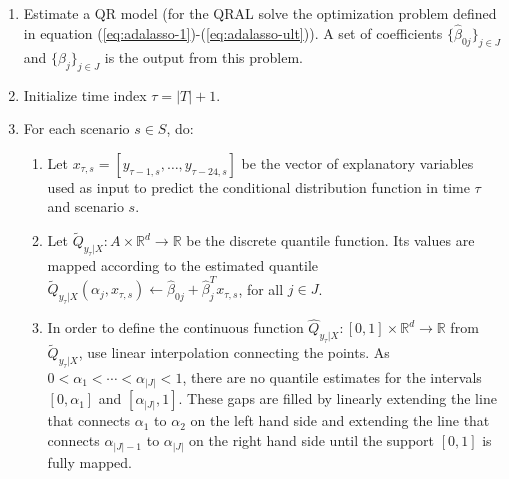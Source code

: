 \begin{enumerate}
	
	\item Estimate a QR model (for the QRAL solve the optimization problem defined in equation (\ref{eq:adalasso-1})-(\ref{eq:adalasso-ult})). 
	A set of coefficients $\{ \hat\beta_{0j} \}_{j \in J}$ and $\{ \hat\beta_{j} \}_{j \in J}$ is the output from this problem. 

	\item Initialize time index $\tau = |T| + 1$.
	
	\item For each scenario $s \in S$, do:
		\begin{enumerate}

		\item Let $x_{\tau,s} = [y_{\tau-1,s}, \dots, y_{\tau-24,s}]$ be the vector of explanatory variables used as input to predict the conditional distribution function in time $\tau$ and scenario $s$.

		\item Let $\tilde{Q}_{y_{\tau}|X}:A \times \mathbb{R}^d \rightarrow \mathbb{R}$ be the discrete quantile function. Its values are mapped according to the estimated quantile $\tilde Q_{y_{\tau}|X}(\alpha_j, x_{\tau,s}) \leftarrow \hat\beta_{0j} + \hat\beta_j^T x_{\tau,s}$, for all $j \in J$.
		
		\item In order to define the continuous function $\hat{Q}_{y_{\tau}|X}:[0,1] \times \mathbb{R}^d \rightarrow \mathbb{R}$ from $\tilde Q_{y_{\tau}|X}$, use linear interpolation connecting the points. As $0 < \alpha_1 < \cdots < \alpha_{|J|} < 1$, there are no quantile estimates for the intervals $[0,\alpha_1]$ and $[\alpha_{|J|},1]$. These gaps are filled by linearly extending the line that connects $\alpha_1$ to $\alpha_2$ on the left hand side and extending the line that connects $\alpha_{|J|-1}$ to $\alpha_{|J|}$ on the right hand side until the support $[0,1]$ is fully mapped.  

		
		

\end{enumerate}
\end{enumerate}
